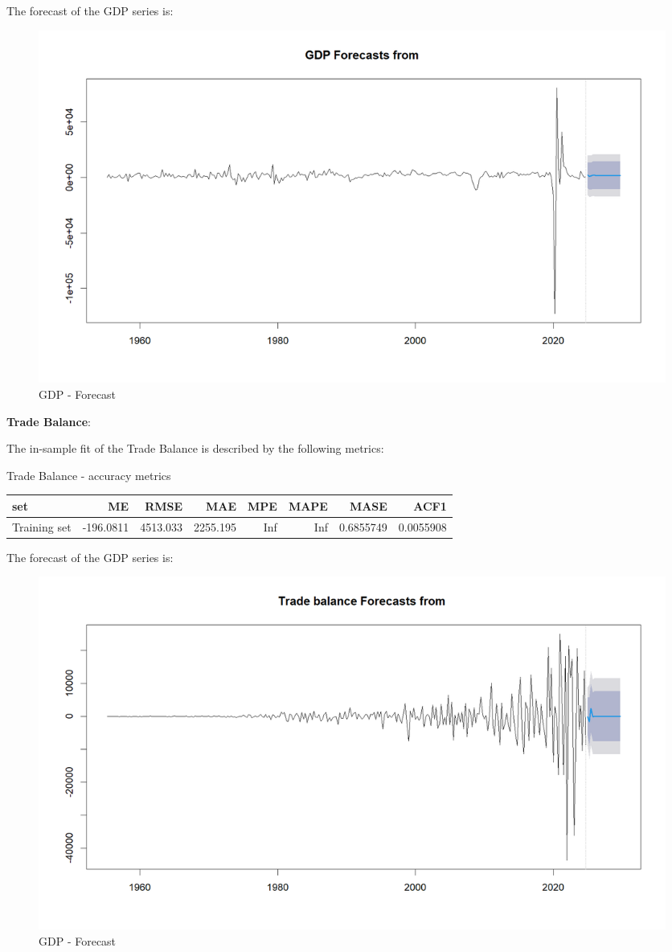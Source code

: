 \documentclass[
]{article}
\begin{document}
The forecast of the GDP series is:

\begin{figure}

{\centering \includegraphics[width=0.8\linewidth]{../results/GDP_forecast} 

}

\caption{GDP - Forecast}\label{fig:unnamed-chunk-16}
\end{figure}

\textbf{Trade Balance}:

The in-sample fit of the Trade Balance is described by the following
metrics:

\bgroup \table[H]
\centering
\caption{\label{tab:unnamed-chunk-17}Trade Balance - accuracy metrics}
\centering
\begin{tabular}[t]{lrrrrrrr}
\toprule
set & ME & RMSE & MAE & MPE & MAPE & MASE & ACF1\\
\midrule
Training set & -196.0811 & 4513.033 & 2255.195 & Inf & Inf & 0.6855749 & 0.0055908\\
\bottomrule
\end{tabular}
\endtable\egroup

The forecast of the GDP series is:

\begin{figure}

{\centering \includegraphics[width=0.8\linewidth]{../results/Trade Balance_forecast} 

}

\caption{GDP - Forecast}\label{fig:unnamed-chunk-18}
\end{figure}
\end{document}
